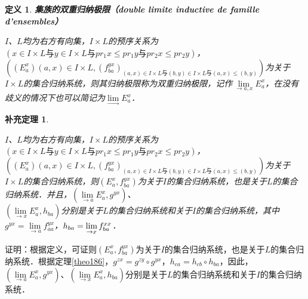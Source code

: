 \documentclass[12pt, a4paper, oneside]{book}
\newtheorem{cor}{补充定理}
\newtheorem{de}{定义}
\begin{document}
			\begin{de}
				\textbf{集族的双重归纳极限（double limite inductive de famille d'ensembles）}
				\par
				$I$、$L$均为右方有向集，$I\times L$的预序关系为$(x\in I\times L\text{与}y\in I\times L\text{与}pr_1x\leq pr_1y\text{与}pr_2x\leq pr_2y)$，$((E_a^x)(a, x)\in I\times L, (f_{ba}^{yx})_{(a, x)\in I\times L\text{与}(b, y)\in I\times L\text{与}(a, x)\leq (b, y)})$为关于$I\times L$的集合归纳系统，则其归纳极限称为双重归纳极限，记作$\lim\limits_{\to a, x}E_a^x$，在没有歧义的情况下也可以简记为$\lim\limits_\to E_a^x$．
			\end{de}
			
			\begin{cor}\label{cor431}
				\hfill\par
				$I$、$L$均为右方有向集，$I\times L$的预序关系为$(x\in I\times L\text{与}y\in I\times L\text{与}pr_1x\leq pr_1y\text{与}pr_2x\leq pr_2y)$，$((E_a^x)(a, x)\in I\times L, (f_{ba}^{yx})_{(a, x)\in I\times L\text{与}(b, y)\in I\times L\text{与}(a, x)\leq (b, y)})$为关于$I\times L$的集合归纳系统，则$(E_a^x, f_{ba}^{yx})$为关于$I$的集合归纳系统，也是关于$L$的集合归纳系统．并且，$(\lim\limits_{\to a}E_a^x, g^{yx})$、\\$(\lim\limits_{\to x}E_a^x, h_{ba})$分别是关于$L$的集合归纳系统和关于$I$的集合归纳系统，其中$g^{yx}=\lim\limits_{\to a}f_{aa}^{yx}$，$h_{ba}\\=\lim\limits_{\to x}f_{ba}^{xx}$．
			\end{cor}
			证明：根据定义，可证则$(E_a^x, f_{ba}^{yx})$为关于$I$的集合归纳系统，也是关于$L$的集合归纳系统．根据定理\ref{theo186}，$g^{zx}=g^{zy}\circ g^{yx}$，$h_{ca}=h_{cb}\circ h_{ba}$，因此，$(\lim\limits_{\to a}E_a^x, g^{yx})$、$(\lim\limits_{\to x}E_a^x, h_{ba})$分别是关于$L$的集合归纳系统和关于$I$的集合归纳系统．
			
\end{document}
